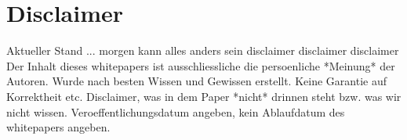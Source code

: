 \section{Disclaimer}

Aktueller Stand ... morgen kann alles anders sein
disclaimer disclaimer disclaimer
Der Inhalt dieses whitepapers ist ausschliessliche die persoenliche *Meinung* der Autoren. Wurde nach besten Wissen und Gewissen erstellt.
Keine Garantie auf Korrektheit etc. Disclaimer, was in dem Paper *nicht* drinnen steht bzw. was wir nicht wissen.  Veroeffentlichungsdatum angeben, kein Ablaufdatum des whitepapers angeben.


